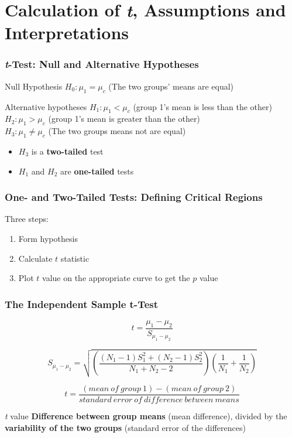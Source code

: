 \documentclass[12pt, block=fill]{beamer}
\begin{document}



\section{Calculation of \textit{t}, Assumptions and Interpretations}

\begin{frame}
  \frametitle{\textit{t}-Test: Null and Alternative Hypotheses}

  \begin{exampleblock}{Null Hypothesis}
    $H_{0}: \mu_{1} = \mu_{c}$ (The two groups' means are equal)
  \end{exampleblock}
  
  \begin{exampleblock}{Alternative hypotheses}
    $H_{1}: \mu_{1} < \mu_{c}$ (group 1's mean is less than the other) \\
    $H_{2}: \mu_{1} > \mu_{c}$ (group 1's mean is greater than the other) \\
    $H_{3}: \mu_{1} \neq \mu_{c}$ (The two groups means not are equal)
  \end{exampleblock}
  \begin{itemize}
      \item $H_{3}$ is a \textbf{two-tailed} test
      \item $H_{1}$ and $H_{2}$ are \textbf{one-tailed} tests
  \end{itemize}
\end{frame}

\begin{frame}
  \frametitle{One- and Two-Tailed Tests: Defining Critical Regions}
  
  Three steps:
  \begin{enumerate}
      \item Form hypothesis
      \item Calculate $t$ statistic
      \item Plot $t$ value on the appropriate curve to get the $p$ value
  \end{enumerate}
\end{frame}

\begin{frame}
  \frametitle{The Independent Sample t-Test}

  $$t = \frac{\mu_{1}-\mu_{2}}{S_{\mu_{1}-\mu_{2}}} $$

  $$
    S_{\mu_{1}-\mu_{2}} = \sqrt{ (\frac{ (N_{1}-1)S_{1}^{2} + (N_{2}-1)S_{2}^{2} }{ N_{1}+N_{2}-2 })
                    (\frac{1}{ N_{1} } + \frac{1}{ N_{2} })
                  }
  $$

  $$
    t = \frac{(mean\ of\ group\ 1) - (mean\ of\ group\ 2)}{standard\ error\ of\ difference\ between\ means}
  $$
  
  
  \begin{exampleblock}{\textit{t} value}
    \textbf{Difference between group means} (mean difference), divided by the \textbf{variability of the two groups} (standard error of the differences)
  \end{exampleblock}

\end{frame}
\end{document}
